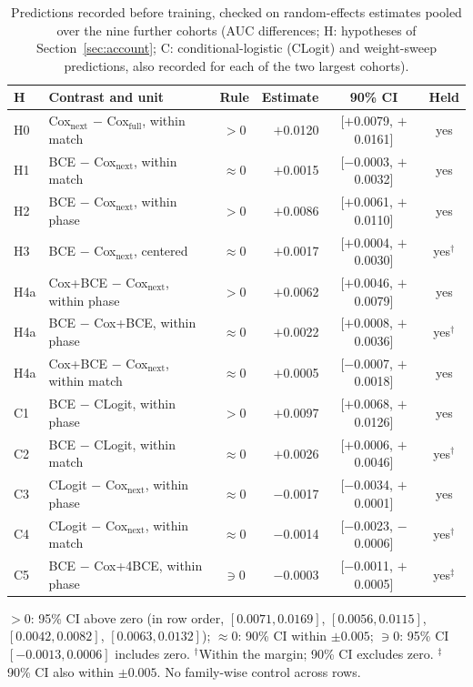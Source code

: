\begin{table}[b]
\centering\footnotesize
\caption{Predictions recorded before training, checked on random-effects estimates pooled over the nine further cohorts (AUC differences; H: hypotheses of Section~\ref{sec:account}; C: conditional-logistic (CLogit) and weight-sweep predictions, also recorded for each of the two largest cohorts).}
\label{tab:predictions}
\setlength{\tabcolsep}{2.1pt}
\begin{tabular}{llcrcc}
\toprule
H & Contrast and unit & Rule & Estimate & 90\% CI & Held \\
\midrule
H0 & Cox$_{\mathrm{next}}$ $-$ Cox$_{\mathrm{full}}$, within match & $>0$ & $+$0.0120 & [$+$0.0079, $+$0.0161] & yes \\
H1 & BCE $-$ Cox$_{\mathrm{next}}$, within match & $\approx0$ & $+$0.0015 & [$-$0.0003, $+$0.0032] & yes \\
H2 & BCE $-$ Cox$_{\mathrm{next}}$, within phase & $>0$ & $+$0.0086 & [$+$0.0061, $+$0.0110] & yes \\
H3 & BCE $-$ Cox$_{\mathrm{next}}$, centered & $\approx0$ & $+$0.0017 & [$+$0.0004, $+$0.0030] & yes$^\dagger$ \\
H4a & Cox+BCE $-$ Cox$_{\mathrm{next}}$, within phase & $>0$ & $+$0.0062 & [$+$0.0046, $+$0.0079] & yes \\
H4a & BCE $-$ Cox+BCE, within phase & $\approx0$ & $+$0.0022 & [$+$0.0008, $+$0.0036] & yes$^\dagger$ \\
H4a & Cox+BCE $-$ Cox$_{\mathrm{next}}$, within match & $\approx0$ & $+$0.0005 & [$-$0.0007, $+$0.0018] & yes \\
\midrule
C1 & BCE $-$ CLogit, within phase & $>0$ & $+$0.0097 & [$+$0.0068, $+$0.0126] & yes \\
C2 & BCE $-$ CLogit, within match & $\approx0$ & $+$0.0026 & [$+$0.0006, $+$0.0046] & yes$^\dagger$ \\
C3 & CLogit $-$ Cox$_{\mathrm{next}}$, within phase & $\approx0$ & $-$0.0017 & [$-$0.0034, $+$0.0001] & yes \\
C4 & CLogit $-$ Cox$_{\mathrm{next}}$, within match & $\approx0$ & $-$0.0014 & [$-$0.0023, $-$0.0006] & yes$^\dagger$ \\
C5 & BCE $-$ Cox+4BCE, within phase & $\ni0$ & $-$0.0003 & [$-$0.0011, $+$0.0005] & yes$^\ddagger$ \\
\bottomrule
\end{tabular}
\smallskip
\parbox{\columnwidth}{\scriptsize $>0$: 95\% CI above zero (in row order, $[0.0071, 0.0169]$, $[0.0056, 0.0115]$, $[0.0042, 0.0082]$, $[0.0063, 0.0132]$); $\approx0$: 90\% CI within $\pm0.005$; $\ni0$: 95\% CI $[-0.0013, 0.0006]$ includes zero. $^\dagger$Within the margin; 90\% CI excludes zero. $^\ddagger$90\% CI also within $\pm0.005$. No family-wise control across rows.}
\end{table}
